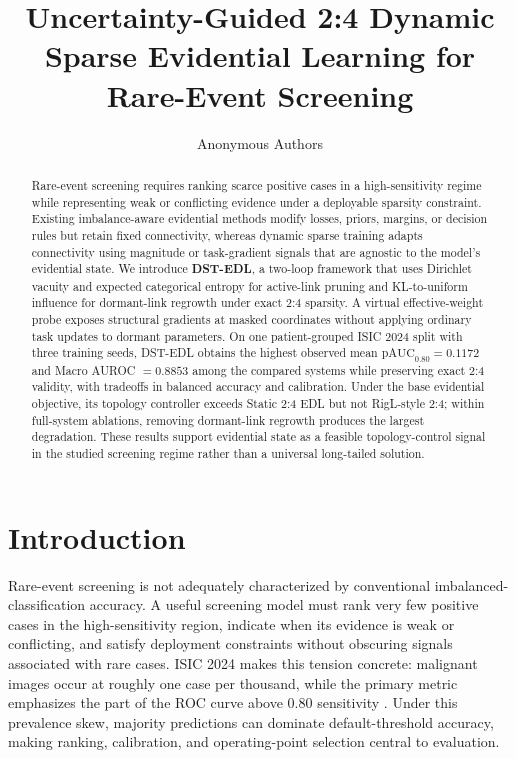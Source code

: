 \documentclass[letterpaper]{article}
\title{Uncertainty-Guided 2:4 Dynamic Sparse Evidential Learning for Rare-Event Screening}
\author{Anonymous Authors}
\begin{document}
\maketitle

\begin{abstract}
Rare-event screening requires ranking scarce positive cases in a high-sensitivity regime while representing weak or conflicting evidence under a deployable sparsity constraint. Existing imbalance-aware evidential methods modify losses, priors, margins, or decision rules but retain fixed connectivity, whereas dynamic sparse training adapts connectivity using magnitude or task-gradient signals that are agnostic to the model's evidential state. We introduce \textbf{DST-EDL}, a two-loop framework that uses Dirichlet vacuity and expected categorical entropy for active-link pruning and KL-to-uniform influence for dormant-link regrowth under exact 2:4 sparsity. A virtual effective-weight probe exposes structural gradients at masked coordinates without applying ordinary task updates to dormant parameters. On one patient-grouped ISIC 2024 split with three training seeds, DST-EDL obtains the highest observed mean $\mathrm{pAUC}_{0.80}=0.1172$ and Macro AUROC $=0.8853$ among the compared systems while preserving exact 2:4 validity, with tradeoffs in balanced accuracy and calibration. Under the base evidential objective, its topology controller exceeds Static 2:4 EDL but not RigL-style 2:4; within full-system ablations, removing dormant-link regrowth produces the largest degradation. These results support evidential state as a feasible topology-control signal in the studied screening regime rather than a universal long-tailed solution.
\end{abstract}

\section{Introduction}\label{sec:intro}

Rare-event screening is not adequately characterized by conventional imbalanced-classification accuracy. A useful screening model must rank very few positive cases in the high-sensitivity region, indicate when its evidence is weak or conflicting, and satisfy deployment constraints without obscuring signals associated with rare cases. ISIC 2024 makes this tension concrete: malignant images occur at roughly one case per thousand, while the primary metric emphasizes the part of the ROC curve above $0.80$ sensitivity \cite{isic2024slice3d}. Under this prevalence skew, majority predictions can dominate default-threshold accuracy, making ranking, calibration, and operating-point selection central to evaluation.
\end{document}
